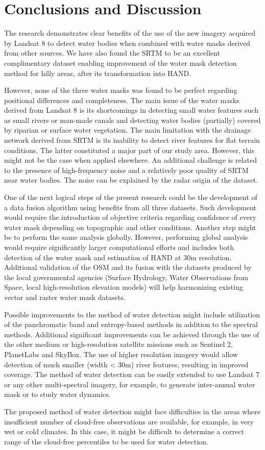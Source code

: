\section{Conclusions and Discussion}
The research demonstrates clear benefits of the use of the new imagery acquired by Landsat 8 to detect water bodies when combined with water masks derived from other sources. We have also found the SRTM to be an excellent complimentary dataset enabling improvement of the water mask detection method for hilly areas, after its transformation into HAND.

However, none of the three water masks was found to be perfect regarding positional differences and completeness. The main issue of the water masks derived from Landsat 8 is its shortcomings in detecting small water features such as small rivers or man-made canals and detecting water bodies (partially) covered by riparian or surface water vegetation. The main limitation with the drainage network derived from SRTM is its inability to detect river features for flat terrain conditions. The latter constituted a major part of our study area. However, this might not be the case when applied elsewhere. An additional challenge is related to the presence of high-frequency noise and a relatively poor quality of SRTM near water bodies. The noise can be explained by the radar origin of the dataset. 

One of the next logical steps of the present research could be the development of a data fusion algorithm using benefits from all three datasets. Such development would require the introduction of objective criteria regarding confidence of every water mask depending on topographic and other conditions. Another step might be to perform the same analysis globally. However, performing global analysis would require significantly larger computational efforts and includes both detection of the water mask and estimation of HAND at 30m resolution. Additional validation of the OSM and its fusion with the datasets produced by the local governmental agencies (Surface Hydrology, Water Observations from Space, local high-resolution elevation models) will help harmonizing existing vector and raster water mask datasets.

Possible improvements to the method of water detection might include utilization of the panchromatic band and entropy-based methods in addition to the spectral methods. Additional significant improvements can be achieved through the use of the other medium or high-resolution satellite missions such as Sentinel 2, PlanetLabs and SkyBox. The use of higher resolution imagery would allow detection of much smaller (width < 30m) river features, resulting in improved coverage.
The method of water detection can be easily extended to use Landsat 7 or any other multi-spectral imagery, for example, to generate inter-annual water mask or to study water dynamics. 

The proposed method of water detection might face difficulties in the areas where insufficient number of cloud-free observations are available, for example, in very wet or cold climates. In this case, it might be difficult to determine a correct range of the cloud-free percentiles to be used for water detection. 
